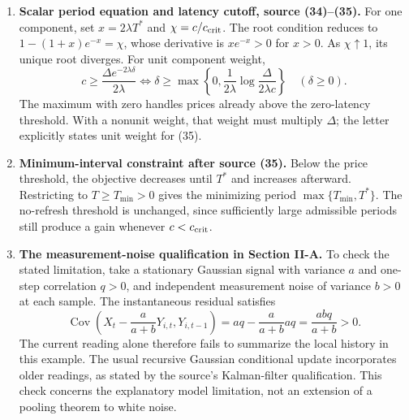 \documentclass[11pt,letterpaper]{article}
\newcommand{\Cov}{\operatorname{Cov}}
\begin{document}
\begin{enumerate}
\item \textbf{Scalar period equation and latency cutoff, source (34)--(35).}
For one component, set $x=2\lambda T^*$ and $\chi=c/c_{\rm crit}$. The root condition reduces to $1-(1+x)e^{-x}=\chi$, whose derivative is $xe^{-x}>0$ for $x>0$. As $\chi\uparrow1$, its unique root diverges. For unit component weight,
\[
c\ge\frac{\Delta e^{-2\lambda\delta}}{2\lambda}
\iff
\delta\ge\max\left\{0,\frac{1}{2\lambda}\log\frac{\Delta}{2\lambda c}\right\}
\quad(\delta\ge0).
\]
The maximum with zero handles prices already above the zero-latency threshold. With a nonunit weight, that weight must multiply $\Delta$; the letter explicitly states unit weight for (35).

\item \textbf{Minimum-interval constraint after source (35).}
Below the price threshold, the objective decreases until $T^*$ and increases afterward. Restricting to $T\ge T_{\min}>0$ gives the minimizing period $\max\{T_{\min},T^*\}$. The no-refresh threshold is unchanged, since sufficiently large admissible periods still produce a gain whenever $c<c_{\rm crit}$.

\item \textbf{The measurement-noise qualification in Section II-A.}
To check the stated limitation, take a stationary Gaussian signal with variance $a$ and one-step correlation $q>0$, and independent measurement noise of variance $b>0$ at each sample. The instantaneous residual satisfies
\[
\Cov\left(X_t-\frac{a}{a+b}Y_{i,t},Y_{i,t-1}\right)
=aq-\frac{a}{a+b}aq=\frac{abq}{a+b}>0.
\]
The current reading alone therefore fails to summarize the local history in this example. The usual recursive Gaussian conditional update incorporates older readings, as stated by the source's Kalman-filter qualification. This check concerns the explanatory model limitation, not an extension of a pooling theorem to white noise.
\end{enumerate}
\end{document}
